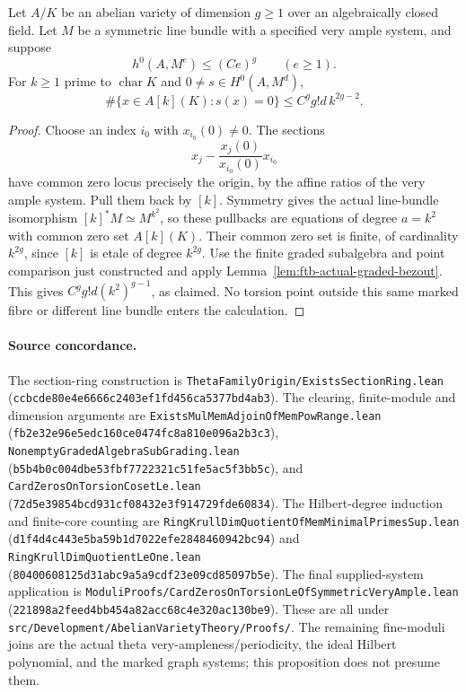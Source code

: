 \begin{proposition}
\label{prop:ftb-torsion-zero-growth}
Let \(A/K\) be an abelian variety of dimension \(g\ge1\)
over an algebraically closed field.
Let \(M\) be a symmetric line bundle with a specified
very ample system, and suppose
\[
                h^0(A,M^e)\le(Ce)^g\qquad(e\ge1).
\]
For \(k\ge1\) prime to \(\operatorname{char}K\) and
\(0\ne s\in H^0(A,M^d)\),
\[
             \#\{x\in A[k](K):s(x)=0\}
                         \le C^g g!d\,k^{2g-2}.
 \tag{TZ11}\label{eq:ftb-torsion-zero-bound}
\]
\end{proposition}
\begin{proof}
Choose an index \(i_0\) with \(x_{i_0}(0)\ne0\).
The sections
\[
                    x_j-\frac{x_j(0)}{x_{i_0}(0)}x_{i_0}
\]
have common zero locus precisely the origin, by the affine
ratios of the very ample system.
Pull them back by \([k]\).
Symmetry gives the actual line-bundle isomorphism
\([k]^*M\simeq M^{k^2}\), so these pullbacks are equations
of degree \(a=k^2\) with common zero set \(A[k](K)\).
Their common zero set is finite, of cardinality \(k^{2g}\),
since \([k]\) is etale of degree \(k^{2g}\).
Use the finite graded subalgebra and point comparison
just constructed and apply
Lemma~\ref{lem:ftb-actual-graded-bezout}.
This gives \(C^gg!d(k^2)^{g-1}\), as claimed.
No torsion point outside this same marked fibre or
different line bundle enters the calculation.
\end{proof}

\paragraph{Source concordance.}
The section-ring construction is
\texttt{ThetaFamilyOrigin/ExistsSectionRing.lean}
(\texttt{ccbcde80e4e6666c2403ef1fd456ca5377bd4ab3}).
The clearing, finite-module and dimension arguments are
\texttt{ExistsMulMemAdjoinOfMemPowRange.lean}
(\texttt{fb2e32e96e5edc160ce0474fc8a810e096a2b3c3}),
\texttt{NonemptyGradedAlgebraSubGrading.lean}
(\texttt{b5b4b0c004dbe53fbf7722321c51fe5ac5f3bb5c}),
and \texttt{CardZerosOnTorsionCosetLe.lean}
(\texttt{72d5e39854bcd931cf08432e3f914729fde60834}).
The Hilbert-degree induction and finite-core counting are
\texttt{RingKrullDimQuotientOfMemMinimalPrimesSup.lean}
(\texttt{d1f4d4c443e5ba59b1d7022efe2848460942bc94})
and \texttt{RingKrullDimQuotientLeOne.lean}
(\texttt{80400608125d31abc9a5a9cdf23e09cd85097b5e}).
The final supplied-system application is
\texttt{ModuliProofs/CardZerosOnTorsionLeOfSymmetricVeryAmple.lean}
(\texttt{221898a2feed4bb454a82acc68c4e320ac130be9}).
These are all under
\texttt{src/Development/AbelianVarietyTheory/Proofs/}.
The remaining fine-moduli joins are the actual theta
very-ampleness/periodicity, the ideal Hilbert polynomial,
and the marked graph systems; this proposition does
not presume them.
